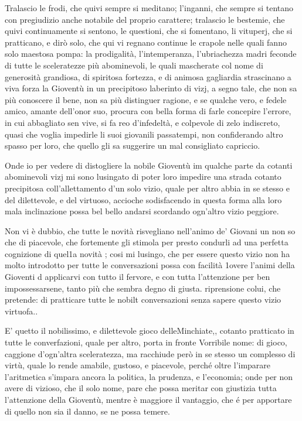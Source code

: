 \documentclass[12pt,a6paper]{article}
\begin{document}
Tralascio le frodi, che quivi
sempre si meditano; l'inganni,
che sempre si tentano con
pregiudizio anche notabile del
proprio carattere; tralascio
le bestemie, che quivi continuamente
si sentono, le questioni, che si
fomentano, li vituperj, che si
pratticano, e dirò solo, che qui
vi regnano continue le crapole
nelle quali fanno solo maestosa
pompa: la prodigalità, l'intemperanza,
l'ubriachezza madri
feconde di tutte le sceleratezze
più abominevoli, le quali mascherate
col nome di generosità
grandiosa, di spiritosa fortezza,
e di animosa gagliardia strascinano
a viva forza la Gioventù in
un precipitoso laberinto di vizj,
a segno tale, che non sa più conoscere
il bene, non sa più distinguer ragione, e se qualche
vero, e fedele amico, amante
dell’onor suo, procura con bella
forma di farle concepire l’errore,
in cui abbagliato sen vive,
si fa reo d’infedeltà, e colpevole
di zelo indiscreto, quasi che
voglia impedirle li suoi giovanili
passatempi, non confiderando
altro spasso per loro, che
quello gli sa suggerire un mal
consigliato capriccio.

Onde io per vedere di distogliere
la nobile Gioventù im
qualche parte da cotanti abominevoli
vizj mi sono lusingato
di poter loro impedire una
strada cotanto precipitosa
coll'allettamento d’un solo vizio,
quale per altro abbia in se stesso
e del dilettevole, e del virtuoso,
accioche sodisfacendo in questa
forma alla loro mala inclinazione
possa bel bello andarsi
scordando ogn’altro vizio
peggiore.

Non vi è dubbio, che tutte
le novità risvegliano nell'animo
de’ Giovani un non so che di 
piacevole, che fortemente gli
stimola per presto condurli ad
una perfetta cognizione di
quel1a novità ; cosi mi lusingo, che
per essere questo vizio non ha
molto introdotto per tutte le
conversazioni possa con facilità
1overe l’animi della Gioventi
d applicarvi con tutto il fervore,
e con tutta l'attenzione
per ben impossessarsene, tanto
più che sembra degno di giusta.
riprensione colui, che pretende:
di pratticare tutte le nobilt conversazioni
senza sapere questo
vizio virtuofa..

E’ quetto il nobilissimo,
e dilettevole gioco delleMinchiate,,
cotanto pratticato in tutte le
converfazioni, quale per altro,
porta in fronte Vorribile nome:
di gioco, caggione d’ogn’altra
sceleratezza, ma racchiude però
in se stesso un complesso di
virtù, quale lo rende amabile,
gustoso, e piacevole, perché
oltre l'imparare l'aritmetica
s'impara ancora la politica, la
prudenza, e l'economia; onde
per non avere di vizioso, che il
solo nome, pare che possa meritar
con giustizia tutta l'attenzione
della Gioventù, mentre
è maggiore il vantaggio, che é
per apportare di quello non sia
il danno, se ne possa temere.
\end{document}
